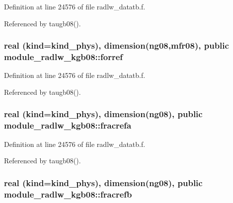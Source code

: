 Definition at line 24576 of file radlw\+\_\+datatb.\+f.



Referenced by taugb08().

\subsubsection[{\texorpdfstring{forref}{forref}}]{\setlength{\rightskip}{0pt plus 5cm}real (kind=kind\+\_\+phys), dimension(ng08,{\bf mfr08}), public module\+\_\+radlw\+\_\+kgb08\+::forref}\hypertarget{namespacemodule__radlw__kgb08_a8427ec5170f6a61a008a8580be6fe5ec}{}\label{namespacemodule__radlw__kgb08_a8427ec5170f6a61a008a8580be6fe5ec}


Definition at line 24576 of file radlw\+\_\+datatb.\+f.



Referenced by taugb08().

\subsubsection[{\texorpdfstring{fracrefa}{fracrefa}}]{\setlength{\rightskip}{0pt plus 5cm}real (kind=kind\+\_\+phys), dimension(ng08), public module\+\_\+radlw\+\_\+kgb08\+::fracrefa}\hypertarget{namespacemodule__radlw__kgb08_ad1a59ffb362cd72537df9c1916c07621}{}\label{namespacemodule__radlw__kgb08_ad1a59ffb362cd72537df9c1916c07621}


Definition at line 24576 of file radlw\+\_\+datatb.\+f.



Referenced by taugb08().

\subsubsection[{\texorpdfstring{fracrefb}{fracrefb}}]{\setlength{\rightskip}{0pt plus 5cm}real (kind=kind\+\_\+phys), dimension(ng08), public module\+\_\+radlw\+\_\+kgb08\+::fracrefb}\hypertarget{namespacemodule__radlw__kgb08_a0ae7e4c01034a2b95c03b041537b962e}{}\label{namespacemodule__radlw__kgb08_a0ae7e4c01034a2b95c03b041537b962e}


